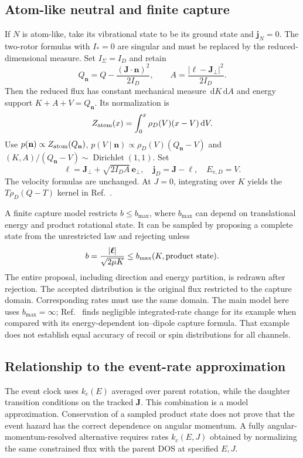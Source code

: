 \documentclass[10pt,a4paper]{article}
\newcommand{\dd}{\,\mathrm d}
\newcommand{\Dir}{\operatorname{Dirichlet}}
\begin{document}
\clearpage
\subsection{Atom-like neutral and finite capture}
If $N$ is atom-like, take its vibrational state to be its ground state and
$\mathbf j_N=0$. The two-rotor formulas with $I_*=0$ are singular and must be
replaced by the reduced-dimensional measure. Set $I_\Sigma=I_D$ and retain
\[
 Q_{\mathbf n}=Q-\frac{(\mathbf J\cdot\mathbf n)^2}{2I_D},\qquad
 A=\frac{|\boldsymbol\ell-\mathbf J_\perp|^2}{2I_D}.
\]
Then the reduced flux has constant mechanical measure $\dd K\dd A$ and
energy support $K+A+V=Q_{\mathbf n}$. Its normalization is
\[
 Z_{\rm atom}(x)=\int_0^x\rho_D(V)(x-V)\dd V.
\]
Use $p(\mathbf n)\propto Z_{\rm atom}(Q_{\mathbf n})$,
$p(V\mid\mathbf n)\propto\rho_D(V)(Q_{\mathbf n}-V)$ and
$(K,A)/(Q_{\mathbf n}-V)\sim\Dir(1,1)$. Set
\[
 \boldsymbol\ell=\mathbf J_\perp+\sqrt{2I_DA}\,\mathbf e_\perp,
 \quad \mathbf j_D=\mathbf J-\boldsymbol\ell,
 \quad E_{v,D}=V.
\]
The velocity formulas are unchanged. At $J=0$, integrating over $K$ yields
the $T\rho_D(Q-T)$ kernel in Ref.~\cite{atom}.

A finite capture model restricts $b\leq b_{\max}$, where $b_{\max}$ can
depend on translational energy and product rotational state. It can be
sampled by proposing a complete state from the unrestricted law and rejecting
unless
\[
 b=\frac{|\boldsymbol\ell|}{\sqrt{2\mu K}}\leq
 b_{\max}(K,\hbox{product state}).
\]
The entire proposal, including direction and energy partition, is redrawn
after rejection. The accepted distribution is the original flux restricted
to the capture domain. Corresponding rates must use the same domain.
The main model here uses $b_{\max}=\infty$; Ref.~\cite{zapadinsky} finds
negligible integrated-rate change for its example when compared with its
energy-dependent ion--dipole capture formula. That example does not establish
equal accuracy of recoil or spin distributions for all channels.

\subsection{Relationship to the event-rate approximation}
The event clock uses $k_c(E)$ averaged over parent rotation, while the
daughter transition conditions on the tracked $\mathbf J$. This combination
is a model approximation. Conservation of a sampled product state does not
prove that the event hazard has the correct dependence on angular momentum.
A fully angular-momentum-resolved alternative requires rates $k_c(E,J)$
obtained by normalizing the same constrained flux with the parent DOS at
specified $E,J$.
\end{document}
